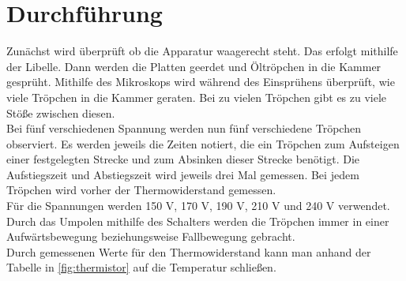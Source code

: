 \section{Durchführung}
\label{sec:Durchführung}

Zunächst wird überprüft ob die Apparatur waagerecht steht. Das erfolgt mithilfe der Libelle.
Dann werden die Platten geerdet und Öltröpchen in die Kammer gesprüht. Mithilfe des Mikroskops
wird während des Einsprühens überprüft, wie viele Tröpchen in die Kammer geraten. Bei zu vielen
Tröpchen gibt es zu viele Stöße zwischen diesen.\\
Bei fünf verschiedenen Spannung werden nun fünf verschiedene Tröpchen observiert. Es werden
jeweils die Zeiten notiert, die ein Tröpchen zum Aufsteigen einer festgelegten Strecke
und zum Absinken dieser Strecke benötigt. Die Aufstiegszeit und Abstiegszeit wird jeweils
drei Mal gemessen. Bei jedem Tröpchen wird vorher der Thermowiderstand gemessen.\\
Für die Spannungen werden 150 V, 170 V, 190 V, 210 V und 240 V verwendet. Durch das Umpolen
mithilfe des Schalters werden die Tröpchen immer in einer Aufwärtsbewegung beziehungsweise
Fallbewegung gebracht.\\
Durch gemessenen Werte für den Thermowiderstand kann man anhand der Tabelle in \autoref{fig:thermistor}
auf die Temperatur schließen.
